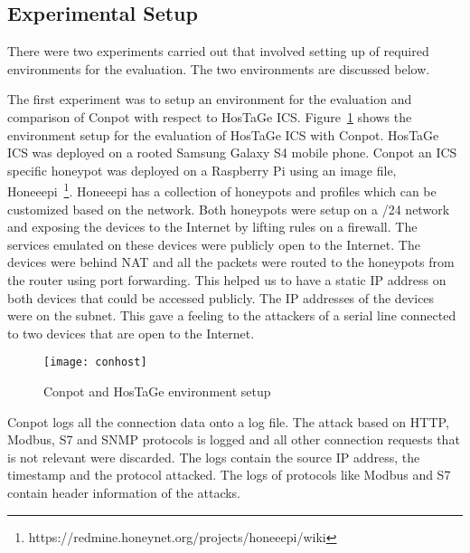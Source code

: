 \documentclass[article,msc=informatik,type=msc,colorback,accentcolor=tud9c]{tudthesis}
\begin{document}
 	
 	\subsection{Experimental Setup}\label{Experimental Setup}
 	There were two experiments carried out that involved setting up of required environments for the evaluation.
 	The two environments are discussed below. 
 	
 	\vspace{3mm}
 	The first experiment was to setup an environment for the evaluation and comparison of Conpot with respect to HosTaGe ICS. Figure~\ref{Conpot and HosTaGe environment setup} shows the environment setup for the evaluation of HosTaGe ICS with Conpot. HosTaGe ICS was deployed on a rooted Samsung Galaxy S4 mobile phone. Conpot an \ac{ICS} specific honeypot was deployed on a Raspberry Pi using an image file, Honeeepi~\footnote{https://redmine.honeynet.org/projects/honeeepi/wiki}. Honeeepi has a collection of honeypots and profiles which can be customized based on the network. Both honeypots were setup on a /24 network and exposing the devices to the Internet by lifting rules on a firewall. The services emulated on these devices were publicly open to the Internet. The devices were behind NAT and all the packets were routed to the honeypots from the router using port forwarding. This helped us to have a static \ac{IP} address on both devices that could be accessed publicly. The \ac{IP} addresses of the devices were on the subnet. This gave a feeling to the attackers of a serial line connected to two devices that are open to the Internet. 
 	
 	\begin{figure}[H]
 						\centering
 						\texttt{[image: conhost]}
 						\caption[Conpot and HosTaGe environment setup]{\label{Conpot and HosTaGe environment setup}Conpot and HosTaGe environment setup}
 						\end{figure}
 	
 	\vspace{3mm}
 	Conpot logs all the connection data onto a log file. The attack based on HTTP, Modbus, S7 and SNMP protocols is logged and all other connection requests that is not relevant were discarded. The logs contain the source \ac{IP} address, the timestamp and the protocol attacked. The logs of protocols like Modbus and S7 contain header information of the attacks. 
 	
\end{document}
